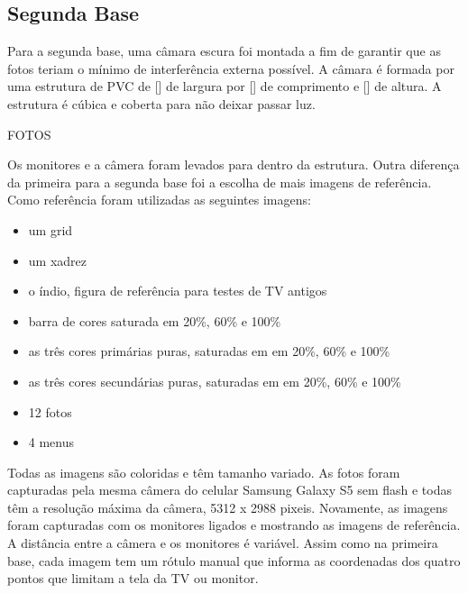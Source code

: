 

\subsection{Segunda Base}

Para a segunda base, uma câmara escura foi montada a fim de garantir que as fotos teriam o mínimo de interferência externa possível. A câmara é formada por uma estrutura de PVC de [] de largura por [] de comprimento e [] de altura. A estrutura é cúbica e coberta para não deixar passar luz. 

FOTOS








Os monitores e a câmera foram levados para dentro da estrutura. Outra diferença da primeira para a segunda base foi a escolha de mais imagens de referência. Como referência foram utilizadas as seguintes imagens:
\begin{itemize}
\item um grid
\item um xadrez
\item o índio, figura de referência para testes de TV antigos
\item barra de cores saturada em 20\%, 60\% e 100\%
\item as três cores primárias puras, saturadas em em 20\%, 60\% e 100\%
\item as três cores secundárias puras, saturadas em em 20\%, 60\% e 100\%
\item 12 fotos
\item 4 menus
\end{itemize}

Todas as imagens são coloridas e têm tamanho variado. As fotos foram capturadas pela mesma câmera do celular Samsung Galaxy S5 sem flash e todas têm a resolução máxima da câmera, 5312 x 2988 pixeis. Novamente, as imagens foram capturadas com os monitores ligados e mostrando as imagens de referência. A distância entre a câmera e os monitores é variável. Assim como na primeira base, cada imagem tem um rótulo manual que informa as coordenadas dos quatro pontos que limitam a tela da TV ou monitor.


